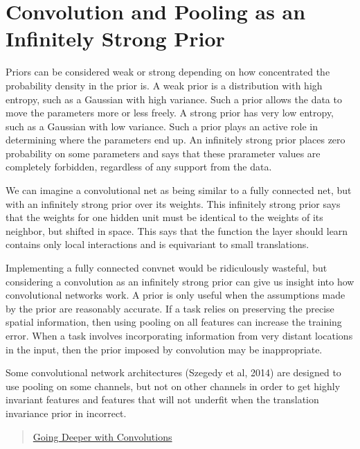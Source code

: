 \documentclass[onecolumn, letterpaper, 12pt]{report}
\begin{document}
\section{Convolution and Pooling as an Infinitely Strong Prior}

Priors can be considered weak or strong depending on how concentrated the probability density in the prior is. A weak prior is a distribution with high entropy, such as a Gaussian with high variance. Such a prior allows the data to move the parameters more or less freely. A strong prior has very low entropy, such as a Gaussian with low variance. Such a prior plays an active role in determining where the parameters end up. An infinitely strong prior places zero probability on some parameters and says that these prarameter values are completely forbidden, regardless of any support from the data. 

We can imagine a convolutional net as being similar to a fully connected net, but with an infinitely strong prior over its weights. This infinitely strong prior says that the weights for one hidden unit must be identical to the weights of its neighbor, but shifted in space. This says that the function the layer should learn contains only local interactions and is equivariant to small translations. 

Implementing a fully connected convnet would be ridiculously wasteful, but considering a convolution as an infinitely strong prior can give us insight into how convolutional networks work. A prior is only useful when the assumptions made by the prior are reasonably accurate. If a task relies on preserving the precise spatial information, then using pooling on all features can increase the training error. When a task involves incorporating information from very distant locations in the input, then the prior imposed by convolution may be inappropriate. 

Some convolutional network architectures (Szegedy et al, 2014) are designed to use pooling on some channels, but not on other channels in order to get highly invariant features and features that will not underfit when the translation invariance prior in incorrect. 

\begin{quote}
\href{https://arxiv.org/pdf/1409.4842.pdf}{Going Deeper with Convolutions}  
\end{quote}
\end{document}
